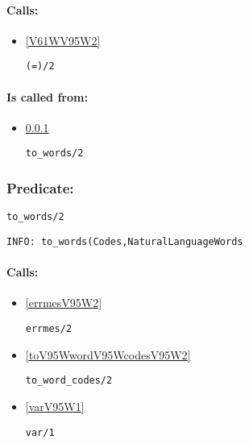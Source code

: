 \paragraph{Calls:} 
\begin{itemize}
\item \ref{V61WV95W2} 
\begin{verbatim}
(=)/2
\end{verbatim}

\end{itemize}
\paragraph{Is called from:} 
\begin{itemize}
\item \ref{toV95WwordsV95W2} 
\begin{verbatim}
to_words/2
\end{verbatim}

\end{itemize}

\subsubsection{Predicate:} \label{toV95WwordsV95W2}

\begin{verbatim}
to_words/2
\end{verbatim}

{\small \begin{verbatim}
INFO: to_words(Codes,NaturalLanguageWords

\end{verbatim}}
\paragraph{Calls:} 
\begin{itemize}
\item \ref{errmesV95W2} 
\begin{verbatim}
errmes/2
\end{verbatim}

\item \ref{toV95WwordV95WcodesV95W2} 
\begin{verbatim}
to_word_codes/2
\end{verbatim}

\item \ref{varV95W1} 
\begin{verbatim}
var/1
\end{verbatim}

\end{itemize}
